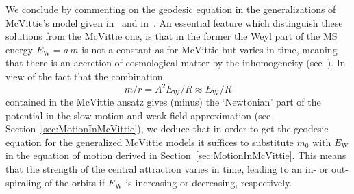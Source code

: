 \documentclass
[rmp,aps,twocolumn,showpacs,preprintnumbers,amsmath,amssymb]{revtex4}
\theoremstyle{plain}
\theoremstyle{definition}
\theoremstyle{remark}
\newcommand{\sss}{\scriptscriptstyle}
\newcommand{\ind}[1]{{\sss \text{#1}}}        %
\begin{document}
We conclude by commenting on the geodesic equation in the generalizations 
of McVittie's model given in~\cite{Faraoni.Jacques:2007} and 
in~\cite{Sultana.Dyer:2005}. An essential feature which distinguish 
these solutions from the McVittie one, is that in the former the 
Weyl part of the MS energy $E_\ind{W}=a\,m$ is not a constant as for McVittie 
but varies in time, meaning that there is an accretion of cosmological 
matter by the inhomogeneity (see~\cite{Carrera.Giulini:2009a}). 
In view of the fact that the combination 
%
\begin{equation}\label{eq:m-over-r-McV}
  m/r = A^2E_\ind{W}/R \approx E_\ind{W}/R 
\end{equation}
%
contained in the McVittie ansatz gives (minus) the `Newtonian' part of the 
potential in the slow-motion and weak-field approximation (see 
Section~\ref{sec:MotionInMcVittie}), we deduce that in order to get 
the geodesic equation for the generalized McVittie models it suffices 
to substitute $m_0$ with $E_\ind{W}$ in the equation of motion derived in 
Section~\ref{sec:MotionInMcVittie}. This means that the strength of the 
central attraction varies in time, leading to an in- or out-spiraling of 
the orbits if $E_\ind{W}$ is increasing or decreasing, respectively.
\end{document}
